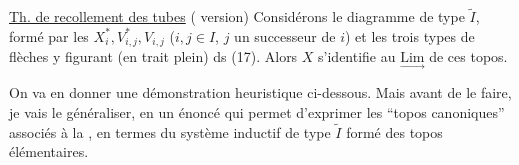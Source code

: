 \uline{Th. de recollement des tubes} ( version) Considérons le diagramme de type $\widetilde I$, formé par les $X_i^*,V_{i,j}^*,V_{i,j}$ ($i,j\in I$, $j$ un successeur de $i$) et les trois types de flèches y figurant (en trait plein) ds (17). Alors $X$ s'identifie au   $\underset{\longrightarrow}{\mathrm{Lim}}$ de ces topos.



On va en donner une démonstration heuristique ci-dessous. Mais avant de le faire, je vais le généraliser, en un énoncé qui permet d'exprimer  les ``topos canoniques'' associés à la , en termes du système inductif de type $\widetilde I$ formé des topos élémentaires.

